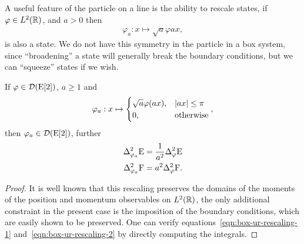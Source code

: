 A useful feature of the particle on a line is the ability to rescale states, if $\varphi\in L^2(\mathbb{R})$, and $a > 0$ then
\begin{align}
  \varphi_a:x\mapsto\sqrt{a}\varphi{ax},
\end{align}
is also a state. We do not have this symmetry in the particle in a box system, since ``broadening'' a state will generally break the boundary conditions, but we can ``squeeze'' states if we wish.
\begin{lem}\label{lem:box-ur-squeeze-states}
  If $\varphi\in\mathcal{D}(\operatorname{E}[2])$, $a \geq 1$ and
  \begin{align}
    \varphi_a:x\mapsto\begin{cases}\sqrt{a}\varphi(ax),& {\left\lvert{ax}\right\rvert}\leq \pi\\ 0, &\text{otherwise}\end{cases},
  \end{align}
  then $\varphi_a\in\mathcal{D}(\operatorname{E}[2])$, further
  \begin{align}
    \var[\varphi_a]{\ope} &= \frac{1}{a^2}\var[\varphi]{\ope}\label{eqn:box-ur-rescaling-1}\\
    \var[\varphi_a]{\opf} &= a^2\var[\varphi]{\opf}.\label{eqn:box-ur-rescaling-2}
  \end{align}
\end{lem}
\begin{proof}
  It is well known that this rescaling preserves the domains of the moments of the position and momentum observables on $L^2(\mathbb{R})$, the only additional constraint in the present case is the imposition of the boundary conditions, which are easily shown to be preserved. One can verify equations~\eqref{eqn:box-ur-rescaling-1} and~\eqref{eqn:box-ur-rescaling-2} by directly computing the integrals.
\end{proof}

